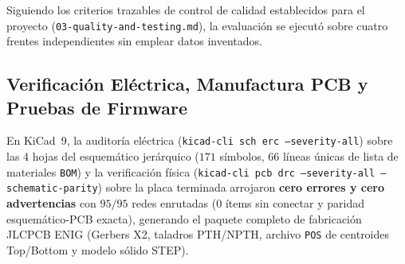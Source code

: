 \documentclass[conference]{IEEEtran}
\begin{document}
Siguiendo los criterios trazables de control de calidad establecidos para el proyecto (\texttt{03-quality-and-testing.md}), la evaluación se ejecutó sobre cuatro frentes independientes sin emplear datos inventados.

\subsection{Verificación Eléctrica, Manufactura PCB y Pruebas de Firmware}

En KiCad~9, la auditoría eléctrica (\texttt{kicad-cli sch erc --severity-all}) sobre las 4 hojas del esquemático jerárquico ($171$ símbolos, $66$ líneas únicas de lista de materiales \texttt{BOM}) y la verificación física (\texttt{kicad-cli pcb drc --severity-all --schematic-parity}) sobre la placa terminada arrojaron \textbf{cero errores y cero advertencias} con $95/95$ redes enrutadas ($0$ ítems sin conectar y paridad esquemático-PCB exacta), generando el paquete completo de fabricación JLCPCB ENIG (Gerbers X2, taladros PTH/NPTH, archivo \texttt{POS} de centroides Top/Bottom y modelo sólido STEP).
\end{document}
